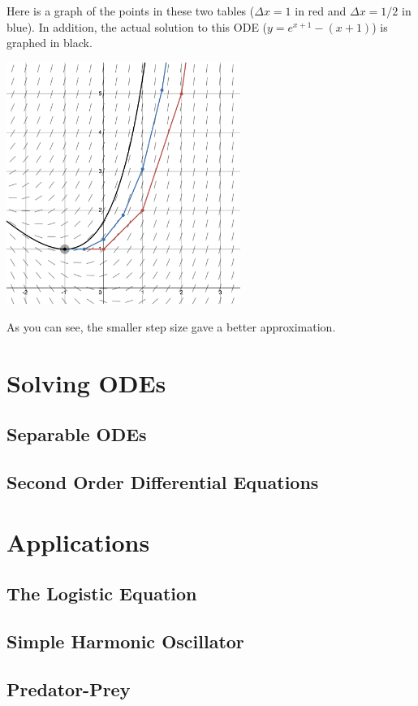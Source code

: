 \begin{itemize}[leftmargin=1em]
Here is a graph of the points in these two tables ($\Delta x = 1$ in red and $\Delta x = 1/2$ in blue). In addition, the actual solution to this ODE ($y=e^{x+1}-(x+1)$) is graphed in black.
\begin{center}
\includegraphics[width=3in]{img/eulers_method.png}
\end{center}
As you can see, the smaller step size gave a better approximation.
\end{itemize}


\section{Solving ODEs}
\subsection{Separable ODEs}
\subsection{Second Order Differential Equations}





\section{Applications}
\subsection{The Logistic Equation}
\subsection{Simple Harmonic Oscillator}
\subsection{Predator-Prey}
